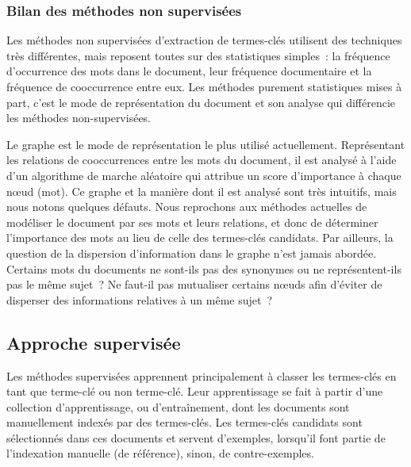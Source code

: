       \subsubsection{Bilan des méthodes non supervisées}
      \label{subsubsec:main-state_of_the_art-automatic_keyphrase_extraction-unsupervised_keyphrase_extraction-bilan}
        Les méthodes non supervisées d'extraction de termes-clés utilisent des
        techniques très différentes, mais reposent toutes sur des statistiques
        simples~: la fréquence d'occurrence des mots dans le document, leur
        fréquence documentaire et la fréquence de cooccurrence entre eux. Les
        méthodes purement statistiques mises à part, c'est le mode de
        représentation du document et son analyse qui différencie les méthodes
        non-supervisées.
        
        Le graphe est le mode de représentation le plus utilisé actuellement.
        Représentant les relations de cooccurrences entre les mots du document,
        il est analysé à l'aide d'un algorithme de marche aléatoire qui attribue
        un score d'importance à chaque n\oe{}ud (mot). Ce graphe et la manière
        dont il est analysé sont très intuitifs, mais nous notons quelques
        défauts. Nous reprochons aux méthodes actuelles de modéliser le document
        par ses mots et leurs relations, et donc de déterminer l'importance des
        mots au lieu de celle des termes-clés candidats. Par ailleurs, la
        question de la dispersion d'information dans le graphe n'est jamais
        abordée. Certains mots du documents ne sont-ils pas des synonymes ou ne
        représentent-ils pas le même sujet~? Ne faut-il pas mutualiser certains
        n\oe{}uds afin d'éviter de disperser des informations relatives à un
        même sujet~?

    \subsection{Approche supervisée}
    \label{subsec:main-state_of_the_art-automatic_keyphrase_extraction-supervised_keyphrase_extraction}
      Les méthodes supervisées apprennent principalement à classer les
      termes-clés en tant que \og{}terme-clé\fg{} ou \og{}non terme-clé\fg{}.
      Leur apprentissage se fait à partir d'une collection d'apprentissage, ou
      d'entraînement, dont les documents sont manuellement indexés par des
      termes-clés. Les termes-clés candidats sont sélectionnés dans ces
      documents et servent d'exemples, lorsqu'il font partie de l'indexation
      manuelle (de référence), sinon, de contre-exemples.

